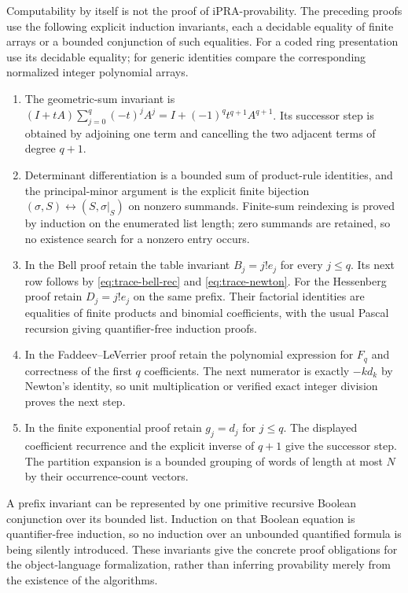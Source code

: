 Computability by itself is not the proof of iPRA-provability.  The preceding
proofs use the following explicit induction invariants, each a decidable
equality of finite arrays or a bounded conjunction of such equalities.
For a coded ring presentation use its decidable equality; for generic
identities compare the corresponding normalized integer polynomial arrays.
\begin{enumerate}
\item The geometric-sum invariant is
$(I+tA)\sum_{j=0}^{q}(-t)^jA^j
 =I+(-1)^qt^{q+1}A^{q+1}$.
Its successor step is obtained by adjoining one term and cancelling the
two adjacent terms of degree $q+1$.
\item Determinant differentiation is a bounded sum of product-rule
identities, and the principal-minor argument is the explicit finite
bijection $(\sigma,S)\leftrightarrow(S,\sigma|_S)$ on nonzero summands.
Finite-sum reindexing is proved by induction on the enumerated list length;
zero summands are retained, so no existence search for a nonzero entry occurs.
\item In the Bell proof retain the table invariant
$B_j=j!e_j$ for every $j\leq q$.  Its next row follows by
\eqref{eq:trace-bell-rec} and \eqref{eq:trace-newton}.  For the Hessenberg
proof retain $D_j=j!e_j$ on the same prefix.  Their factorial identities are
equalities of finite products and binomial coefficients, with the usual
Pascal recursion giving quantifier-free induction proofs.
\item In the Faddeev--LeVerrier proof retain the polynomial expression for
$F_q$ and correctness of the first $q$ coefficients.  The next numerator
is exactly $-k d_k$ by Newton's identity, so unit multiplication or verified
exact integer division proves the next step.
\item In the finite exponential proof retain $g_j=d_j$ for $j\leq q$.
The displayed coefficient recurrence and the explicit inverse of $q+1$
give the successor step.  The partition expansion is a bounded grouping of
words of length at most $N$ by their occurrence-count vectors.
\end{enumerate}
A prefix invariant can be represented by one primitive recursive Boolean
conjunction over its bounded list.  Induction on that Boolean equation is
quantifier-free induction, so no induction over an unbounded quantified
formula is being silently introduced.  These invariants give the concrete
proof obligations for the object-language formalization, rather than
inferring provability merely from the existence of the algorithms.
